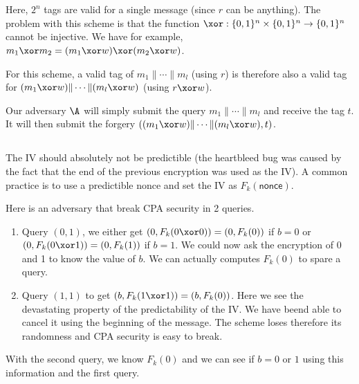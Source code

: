 \section{}
\subsection{}
\begin{solution}
  Here, $2^n$ tags are valid for a single message (since $r$ can be anything).
  The problem with this scheme is that the function $\xor: \{0,1\}^n \times \{0,1\}^n \to \{0,1\}^n$
  cannot be injective.
  We have for example, $m_1 \xor m_2 = (m_1 \xor w) \xor (m_2 \xor w)$.

  For this scheme, a valid tag of $m_1 \| \cdots \| m_l$ (using $r$)
  is therefore also a valid tag for $(m_1 \xor w) \| \cdots \| (m_l \xor w)$ (using $r \xor w$).

  Our adversary $\A$ will simply submit the query $m_1 \| \cdots \| m_l$ and receive the tag $t$.
  It will then submit the forgery $((m_1 \xor w) \| \cdots \| (m_l \xor w), t)$.
\end{solution}

\subsection{}
\begin{solution}
  The IV should absolutely not be predictible (the heartbleed bug was caused by the fact that the end of the previous encryption was used as the IV).
  A common practice is to use a predictible nonce and set the IV as $F_k(\mathsf{nonce})$.

  Here is an adversary that break CPA security in 2 queries.
  \begin{enumerate}
    \item Query $(0,1)$, we either get $(0,F_k(0 \xor 0)) = (0,F_k(0))$ if $b = 0$ or $(0,F_k(0 \xor 1)) = (0,F_k(1))$ if $b = 1$.
      We could now ask the encryption of 0 and 1 to know the value of $b$.
      We can actually computes $F_k(0)$ to spare a query.
    \item Query $(1,1)$ to get $(b, F_k(1 \xor 1)) = (b, F_k(0))$.
      Here we see the devastating property of the predictability of the IV.
      We have beend able to cancel it using the beginning of the message.
      The scheme loses therefore its randomness and CPA security is easy to break.
  \end{enumerate}
  With the second query, we know $F_k(0)$ and we can see if $b = 0$ or $1$ using this information and the first query.
\end{solution}

